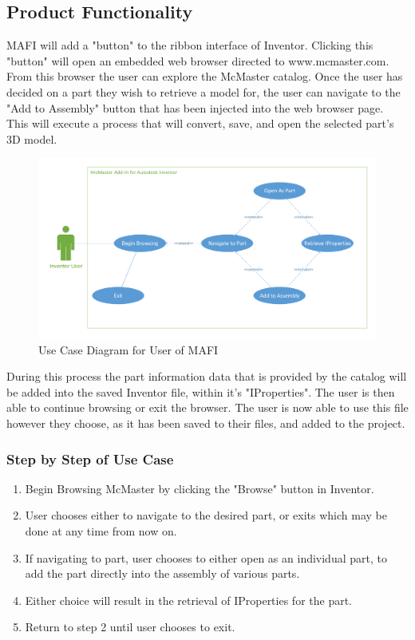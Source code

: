 \documentclass[12pt, letterpaper]{article}
\begin{document}
\subsection{Product Functionality}
MAFI will add a "button" to the ribbon interface of Inventor. Clicking this "button" will open an embedded web browser directed to www.mcmaster.com. 
From this browser the user can explore the McMaster catalog. Once the user has decided on a part they wish to retrieve a model for, the user can navigate 
to the "Add to Assembly" button that has been injected into the web browser page. This will execute a process that will convert, save, and open the selected
part's 3D model. 
\begin{figure}[H]
    \begin{center}
        \includegraphics[width=1\textwidth]{Figures/Use_Case_Diagram.pdf}
    \end{center}
    \caption{Use Case Diagram for User of MAFI}
\end{figure}

During this process the part information data that is provided by the catalog will be added into the saved Inventor file, within it's "IProperties".
 The user is then able to continue browsing or exit the browser. The user is now able to use this file however they choose, as it has been saved to their files, and added to the project.
\subsubsection{Step by Step of Use Case}
\begin{enumerate}
    \item Begin Browsing McMaster by clicking the "Browse" button in Inventor.
    \item User chooses either to navigate to the desired part, or exits which may be done at any time from now on.
    \item If navigating to part, user chooses to either open as an individual part, to add the part directly into the assembly of various parts.
    \item Either choice will result in the retrieval of IProperties for the part.
    \item Return to step 2 until user chooses to exit.
\end{enumerate}
\end{document}
